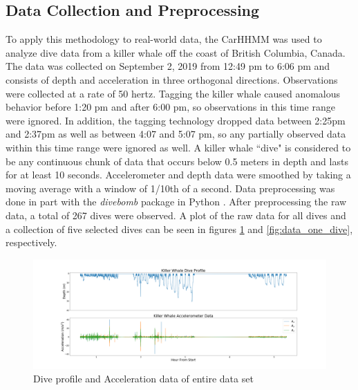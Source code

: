 

\subsection{Data Collection and Preprocessing}

To apply this methodology to real-world data, the CarHHMM was used to analyze dive data from a killer whale off the coast of British Columbia, Canada. The data was collected on September 2, 2019 from 12:49 pm to 6:06 pm and consists of depth and acceleration in three orthogonal directions. Observations were collected at a rate of 50 hertz. Tagging the killer whale caused anomalous behavior before 1:20 pm and after 6:00 pm, so observations in this time range were ignored. In addition, the tagging technology dropped data between 2:25pm and 2:37pm as well as between 4:07 and 5:07 pm, so any partially observed data within this time range were ignored as well. A killer whale ``dive" is considered to be any continuous chunk of data that occurs below 0.5 meters in depth and lasts for at least 10 seconds. Accelerometer and depth data were smoothed by taking a moving average with a window of 1/10th of a second. Data preprocessing was done in part with the \textit{divebomb} package in Python \citep{Nunes:2018}. After preprocessing the raw data, a total of 267 dives were observed. A plot of the raw data for all dives and a collection of five selected dives can be seen in figures \ref{fig:data} and \ref{fig:data_one_dive}, respectively.

\begin{figure}[ht]
	\centering
	\includegraphics[width=5in]{../Plots/raw_data.png}
	\caption{Dive profile and Acceleration data of entire data set}
	\label{fig:data}
\end{figure}

